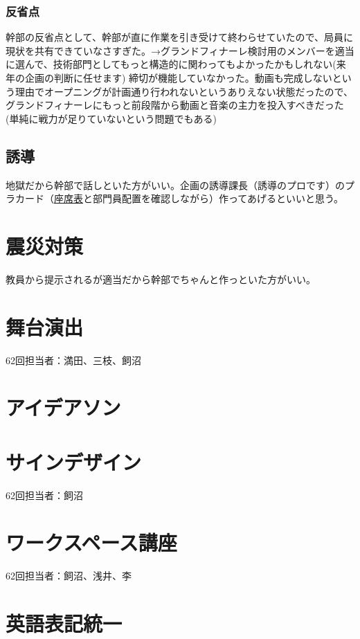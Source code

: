 \documentclass[dvipdfmx,jb5]{jarticle}
\begin{document}
\subsubsection{反省点}
幹部の反省点として、幹部が直に作業を引き受けて終わらせていたので、局員に現状を共有できていなさすぎた。→グランドフィナーレ検討用のメンバーを適当に選んで、技術部門としてもっと構造的に関わってもよかったかもしれない(来年の企画の判断に任せます)
締切が機能していなかった。動画も完成しないという理由でオープニングが計画通り行われないというありえない状態だったので、グランドフィナーレにもっと前段階から動画と音楽の主力を投入すべきだった(単純に戦力が足りていないという問題でもある)
\subsection{誘導}
地獄だから幹部で話しといた方がいい。企画の誘導課長（誘導のプロです）のプラカード（\href{https://docs.google.com/spreadsheets/d/1C1FCAPzH2EJLlMtq1CIA2K3Q68W5yUGb/edit?usp=sharing&ouid=113160890995933864933&rtpof=true&sd=true}{座席表}と部門員配置を確認しながら）作ってあげるといいと思う。

 \section{震災対策}
 教員から提示されるが適当だから幹部でちゃんと作っといた方がいい。

 \section{舞台演出}
62回担当者：満田、三枝、飼沼

 \section{アイデアソン}

 \section{サインデザイン}
62回担当者：飼沼

 \section{ワークスペース講座}
62回担当者：飼沼、浅井、李

 \section{英語表記統一}
\end{document}
